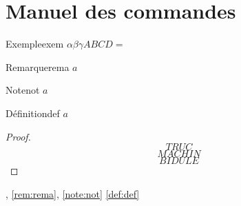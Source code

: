 \documentclass[a4paper,french,final]{memoir}
\begin{document}
\chapter{Manuel des commandes}
\begin{theoremb}{Exemple}{exem}
\(\alpha\beta\gamma ABCD=\)
\end{theoremb}
\begin{remarkb}{Remarque}{rema}
\(a\)
\end{remarkb}
\begin{noteb}{Note}{not}
$a$
\end{noteb}
\begin{defb}{Définition}{def}
$a$
\end{defb}
\begin{proof}
\[TRUC\]
\proofpart{}
\[MACHIN\]
\[BIDULE\]
\end{proof}
, \cref{rem:rema}, \cref{note:not} \cref{def:def} 
\backmatter
\end{document}

